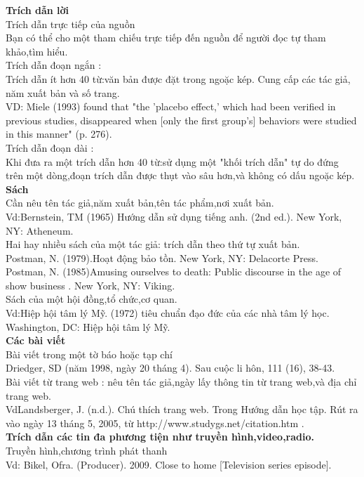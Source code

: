 \documentclass{hcmutarticle}
\begin{document}
{\bfseries Trích dẫn lời}\\Trích dẫn trực tiếp của nguồn\\Bạn có thể cho một tham chiếu trực tiếp đến nguồn để người đọc tự tham khảo,tìm hiểu.\\Trích dẫn đoạn ngắn :\\ Trích dẫn ít hơn 40 từ:văn bản được đặt trong ngoặc kép. Cung cấp các tác giả, năm xuất bản và số trang. \\VD: Miele (1993) found that "the 'placebo effect,' which had been verified in previous studies, disappeared when [only the first group's] behaviors were studied in this manner" (p. 276).\\Trích dẫn đoạn dài :\\Khi đưa ra một trích dẫn hơn 40 từ:sử dụng một "khối trích dẫn" tự do đứng trên một dòng,đoạn trích dẫn được thụt vào sâu hơn,và không có dấu ngoặc kép.\\
  {\bfseries Sách}\\  Cần nêu tên tác giả,năm xuất bản,tên tác phẩm,nơi xuất bản.\\
Vd:Bernstein, TM (1965) Hướng dẫn sử dụng tiếng anh. (2nd ed.). New York, NY: Atheneum.\\
Hai hay nhiều sách của một tác giả: trích dẫn theo thứ tự xuất bản.\\
Postman, N. (1979).Hoạt động bảo tồn. New York, NY: Delacorte Press.\\

Postman, N. (1985)Amusing ourselves to death: Public discourse in the age of show business . New York, NY: Viking.\\Sách của một hội đồng,tổ chức,cơ quan.\\Vd:Hiệp hội tâm lý Mỹ. (1972) tiêu chuẩn đạo đức của các nhà tâm lý học. Washington, DC: Hiệp hội tâm lý Mỹ.\\
{\bfseries Các bài viết}\\
     Bài viết trong một tờ báo hoặc tạp chí\\
Driedger, SD (năm 1998, ngày 20 tháng 4). Sau cuộc li hôn, 111 (16), 38-43.\\
Bài viết từ trang web : nêu tên tác giả,ngày lấy thông tin từ trang web,và địa chỉ trang web.\\
VdLandsberger, J. (n.d.). Chú thích trang web. Trong Hướng dẫn học tập. Rút ra vào ngày 13 tháng 5, 2005, từ http://www.studygs.net/citation.htm .\\
  {\bfseries Trích dẫn các tin đa phương tiện như truyền hình,video,radio.}\\
Truyền hình,chương trình phát thanh\\Vd: Bikel, Ofra. (Producer). 2009. Close to home [Television series episode]. \\
\end{document}
